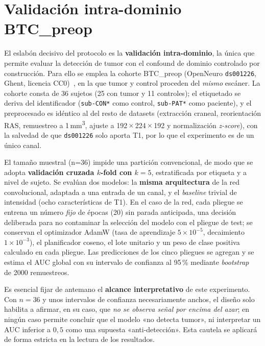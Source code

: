 \section{Validación intra-dominio BTC\_preop}

El eslabón decisivo del protocolo es la \textbf{validación intra-dominio}, la
única que permite evaluar la detección de tumor con el confound de dominio
controlado por construcción. Para ello se emplea la cohorte BTC\_preop
(OpenNeuro \texttt{ds001226}, Ghent, licencia CC0)~\cite{aerts2022btcpreop}, en
la que tumor y control proceden del \emph{mismo} escáner. La cohorte consta de
36 sujetos (25 con tumor y 11 controles); el etiquetado se deriva del
identificador (\texttt{sub-CON*} como control, \texttt{sub-PAT*} como paciente),
y el preprocesado es idéntico al del resto de datasets (extracción craneal,
reorientación RAS, remuestreo a 1\,mm\textsuperscript{3}, ajuste a
192\,$\times$\,224\,$\times$\,192 y normalización \emph{z-score}), con la
salvedad de que \texttt{ds001226} solo aporta T1, por lo que el experimento es
de un único canal.

El tamaño muestral (n=36) impide una partición convencional, de modo que se
adopta \textbf{validación cruzada $k$-fold con $k=5$}, estratificada por etiqueta
y a nivel de sujeto. Se evalúan dos modelos: la \textbf{misma arquitectura} de la
red convolucional, adaptada a una entrada de un canal, y el \emph{baseline}
trivial de intensidad (ocho características de T1). En el caso de la red, cada
pliegue se entrena un número \emph{fijo} de épocas (20) sin parada anticipada,
una decisión deliberada para no contaminar la selección del modelo con el
pliegue de test; se conservan el optimizador AdamW (tasa de aprendizaje
$5\times10^{-5}$, decaimiento $1\times10^{-3}$), el planificador coseno, el lote
unitario y un peso de clase positiva calculado en cada pliegue. Las predicciones
de los cinco pliegues se agregan y se estima el AUC global con su intervalo de
confianza al 95\,\% mediante \emph{bootstrap}~\cite{efron1993bootstrap} de 2000 remuestreos.

Es esencial fijar de antemano el \textbf{alcance interpretativo} de este
experimento. Con $n=36$ y unos intervalos de confianza necesariamente anchos, el
diseño solo habilita a afirmar, en su caso, que \emph{no se observa señal por
encima del azar}; en ningún caso permite concluir que el modelo «no detecta
tumor», ni interpretar un AUC inferior a $0{,}5$ como una supuesta
«anti-detección». Esta cautela se aplicará de forma estricta en la lectura de
los resultados.

